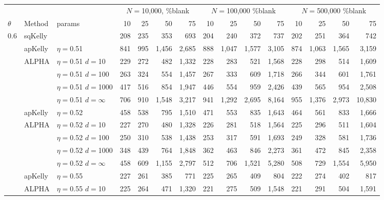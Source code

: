 \documentclass[12pt,runningheads]{llncs}
\begin{document}
{\begin{table}
\centering
\tiny
\begin{tabular}{lll|rrrr|rrrr|rrrr} 
& & & \multicolumn{4}{|c|}{$N=$10,000, \%blank} &  \multicolumn{4}{|c|}{$N=$100,000 \%blank} & \multicolumn{4}{|c}{$N=$500,000 \%blank} \\ 
$\theta$ & Method & params & 10 & 25 & 50 & 75  & 10 & 25 & 50 & 75  & 10 & 25 & 50 & 75  \\
\hline 0.6 & sqKelly & & 208  & 235  & 353  & 693  & 204  & 240  & 372  & 737  & 202  & 251  & 364  & 742  \\
\cline{2-15} & apKelly & $\eta=$0.51 & 841  & 995  & 1,456  & 2,685  & 888  & 1,047  & 1,577  & 3,105  & 874  & 1,063  & 1,565  & 3,159  \\
\cline{2-15}
& ALPHA & $\eta=$0.51 $d=$10 & 229  & 272  & 482  & 1,332  & 228  & 283  & 521  & 1,568  & 228  & 298  & 514  & 1,609  \\
&  & $\eta=$0.51 $d=$100 & 263  & 324  & 554  & 1,457  & 267  & 333  & 609  & 1,718  & 266  & 344  & 601  & 1,761  \\
&  & $\eta=$0.51 $d=$1000 & 417  & 516  & 854  & 1,947  & 446  & 554  & 959  & 2,426  & 439  & 565  & 954  & 2,508  \\
 &  & $\eta=$0.51 $d=\infty$ & 706  & 910  & 1,548  & 3,217  & 941  & 1,292  & 2,695  & 8,164  & 955  & 1,376  & 2,973  & 10,830  \\
\cline{2-15} & apKelly & $\eta=$0.52 & 458  & 538  & 795  & 1,510  & 471  & 553  & 835  & 1,643  & 464  & 561  & 833  & 1,666  \\
\cline{2-15}
& ALPHA & $\eta=$0.52 $d=$10 & 227  & 270  & 480  & 1,328  & 226  & 281  & 518  & 1,564  & 225  & 296  & 511  & 1,604  \\
&  & $\eta=$0.52 $d=$100 & 250  & 310  & 538  & 1,438  & 253  & 317  & 591  & 1,693  & 249  & 328  & 581  & 1,736  \\
&  & $\eta=$0.52 $d=$1000 & 348  & 439  & 764  & 1,848  & 362  & 463  & 846  & 2,273  & 361  & 472  & 845  & 2,358  \\
 &  & $\eta=$0.52 $d=\infty$ & 458  & 609  & 1,155  & 2,797  & 512  & 706  & 1,521  & 5,280  & 508  & 729  & 1,554  & 5,950  \\
\cline{2-15} & apKelly & $\eta=$0.55 & 227  & 261  & 385  & 771  & 225  & 265  & 409  & 804  & 222  & 274  & 402  & 817  \\
\cline{2-15}
& ALPHA & $\eta=$0.55 $d=$10 & 225  & 264  & 471  & 1,320  & 221  & 275  & 509  & 1,548  & 221  & 291  & 504  & 1,591  \\

\end{tabular}
\end{table}}
\end{document}
